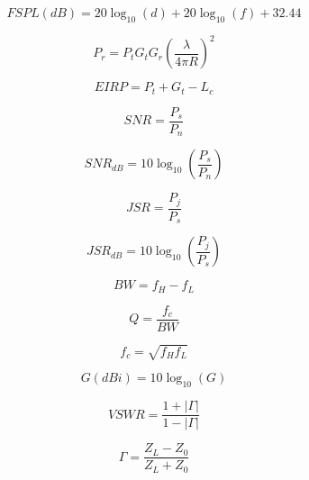 \documentclass[12pt,a4paper]{report}
\begin{document}
	\begin{equation}
		FSPL(dB)=20\log_{10}(d)+20\log_{10}(f)+32.44
		\label{eq:fspl}
	\end{equation}
	
	\begin{equation}
		P_r=P_tG_tG_r\left(\frac{\lambda}{4\pi R}\right)^2
		\label{eq:friis}
	\end{equation}
	
	\begin{equation}
		EIRP=P_t+G_t-L_c
		\label{eq:eirp}
	\end{equation}
	
	\begin{equation}
		SNR=\frac{P_s}{P_n}
		\label{eq:snr}
	\end{equation}
	
	\begin{equation}
		SNR_{dB}=10\log_{10}\left(\frac{P_s}{P_n}\right)
		\label{eq:snr_db}
	\end{equation}
	
	\begin{equation}
		JSR=\frac{P_j}{P_s}
		\label{eq:jsr}
	\end{equation}
	
	\begin{equation}
		JSR_{dB}=10\log_{10}\left(\frac{P_j}{P_s}\right)
		\label{eq:jsr_db}
	\end{equation}
	
	\begin{equation}
		BW=f_H-f_L
		\label{eq:bandwidth}
	\end{equation}
	
	\begin{equation}
		Q=\frac{f_c}{BW}
		\label{eq:q_factor}
	\end{equation}
	
	\begin{equation}
		f_c=\sqrt{f_Hf_L}
		\label{eq:center_frequency}
	\end{equation}
	
	\begin{equation}
		G(dBi)=10\log_{10}(G)
		\label{eq:antenna_gain}
	\end{equation}
	
	\begin{equation}
		VSWR=\frac{1+|\Gamma|}{1-|\Gamma|}
		\label{eq:vswr}
	\end{equation}
	
	\begin{equation}
		\Gamma=\frac{Z_L-Z_0}{Z_L+Z_0}
		\label{eq:reflection}
	\end{equation}
	
\end{document}
